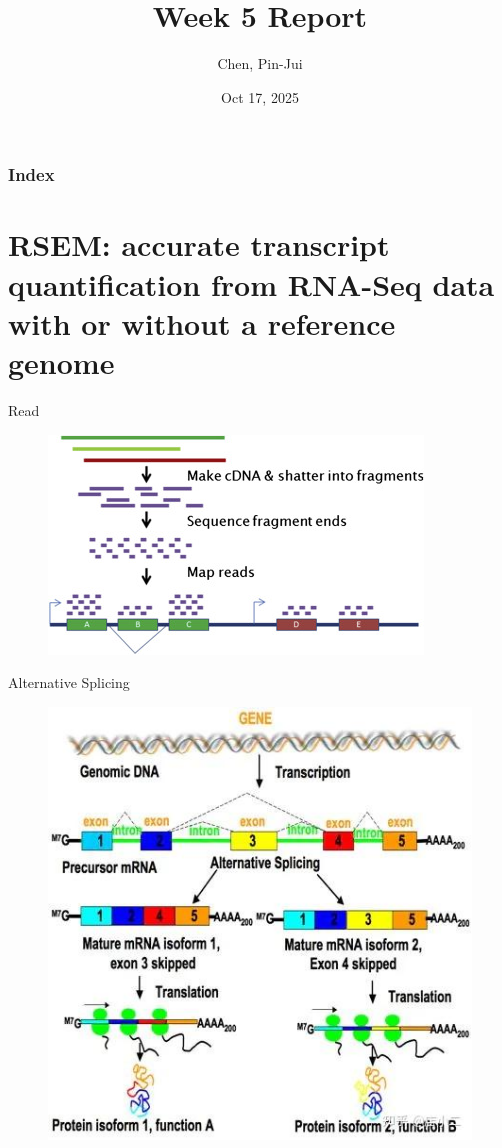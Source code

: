 \documentclass[12pt, aspectratio=43]{beamer}
\title[\textbf{Week 5 Report}]{Week 5 Report}
\author[Chen, Pin-Jui]{Chen, Pin-Jui}
\date[Oct 17, 2025]{Oct 17, 2025}
\begin{document}
\begin{frame}
  \titlepage
\end{frame}

\begin{frame}
  \frametitle{Index}
  \tableofcontents
\end{frame}

\section{RSEM: accurate transcript quantification from RNA-Seq data with or without a reference genome}

\begin{frame}{Read}
	\begin{figure}[h!]
		\centering
		\includegraphics[width=0.8\linewidth]{Figure/Read.jpg}
	\end{figure}
\end{frame}

\begin{frame}{Alternative Splicing}
	\begin{figure}[h!]
		\centering
		\includegraphics[width=0.6\linewidth]{Figure/splicing.jpg}
	\end{figure}
\end{frame}
\end{document}
